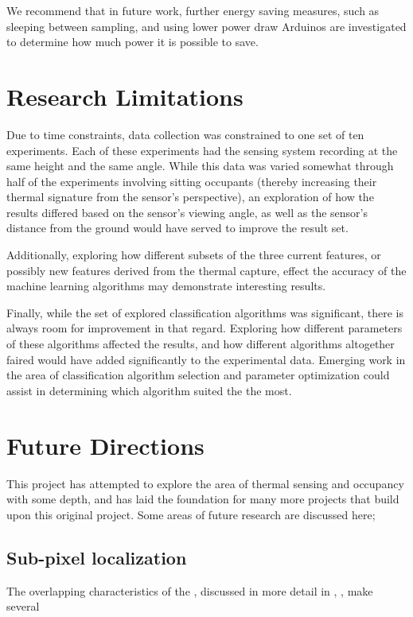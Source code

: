 \documentclass[../thesis/thesis.tex]{subfiles}
\begin{document}
We recommend that in future work, further energy saving measures, such as sleeping between sampling, and using lower power draw Arduinos are investigated to determine how much power it is possible to save.

\section{Research Limitations}
Due to time constraints, data collection was constrained to one set of ten experiments. Each of these experiments had the sensing system recording at the same height and the same angle. While this data was varied somewhat through half of the experiments involving sitting occupants (thereby increasing their thermal signature from the sensor's perspective), an exploration of how the results differed based on the sensor's viewing angle, as well as the sensor's distance from the ground would have served to improve the result set.

Additionally, exploring how different subsets of the three current features, or possibly new features derived from the thermal capture, effect the accuracy of the machine learning algorithms may demonstrate interesting results.

Finally, while the set of explored classification algorithms was significant, there is always room for improvement in that regard. Exploring how different parameters of these algorithms affected the results, and how different algorithms altogether faired would have added significantly to the experimental data. Emerging work in the area of classification algorithm selection and parameter optimization \cite{thornton2013auto} could assist in determining which algorithm suited the \mlx the most.

\section{Future Directions}
This project has attempted to explore the area of thermal sensing and occupancy with some depth, and has laid the foundation for many more projects that build upon this original project. Some areas of future research are discussed here;

\subsection{Sub-pixel localization}
The overlapping characteristics of the \mlx, discussed in more detail in , , make several %
\end{document}
